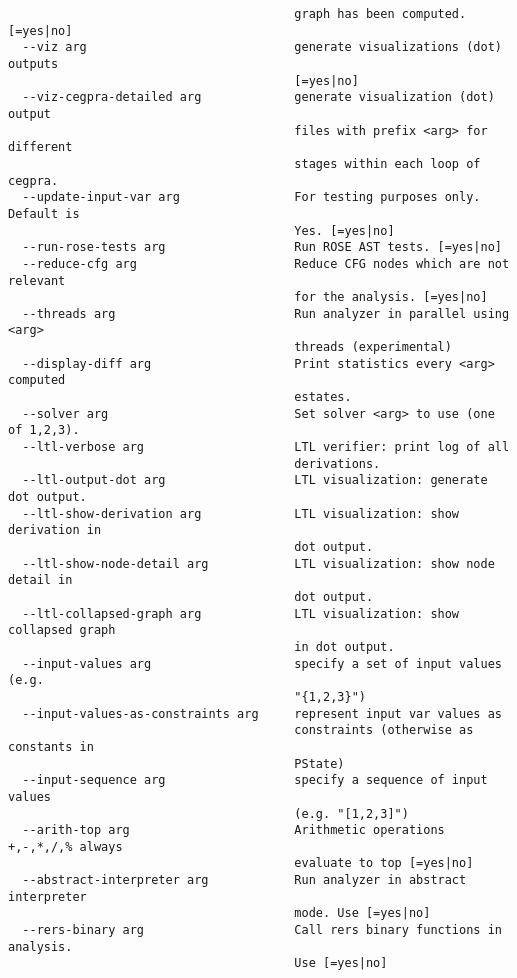 \documentclass[natbib]{article}
\begin{document}
\begin{verbatim}
                                        graph has been computed. [=yes|no]
  --viz arg                             generate visualizations (dot) outputs 
                                        [=yes|no]
  --viz-cegpra-detailed arg             generate visualization (dot) output 
                                        files with prefix <arg> for different 
                                        stages within each loop of cegpra.
  --update-input-var arg                For testing purposes only. Default is 
                                        Yes. [=yes|no]
  --run-rose-tests arg                  Run ROSE AST tests. [=yes|no]
  --reduce-cfg arg                      Reduce CFG nodes which are not relevant
                                        for the analysis. [=yes|no]
  --threads arg                         Run analyzer in parallel using <arg> 
                                        threads (experimental)
  --display-diff arg                    Print statistics every <arg> computed 
                                        estates.
  --solver arg                          Set solver <arg> to use (one of 1,2,3).
  --ltl-verbose arg                     LTL verifier: print log of all 
                                        derivations.
  --ltl-output-dot arg                  LTL visualization: generate dot output.
  --ltl-show-derivation arg             LTL visualization: show derivation in 
                                        dot output.
  --ltl-show-node-detail arg            LTL visualization: show node detail in 
                                        dot output.
  --ltl-collapsed-graph arg             LTL visualization: show collapsed graph
                                        in dot output.
  --input-values arg                    specify a set of input values (e.g. 
                                        "{1,2,3}")
  --input-values-as-constraints arg     represent input var values as 
                                        constraints (otherwise as constants in 
                                        PState)
  --input-sequence arg                  specify a sequence of input values 
                                        (e.g. "[1,2,3]")
  --arith-top arg                       Arithmetic operations +,-,*,/,% always 
                                        evaluate to top [=yes|no]
  --abstract-interpreter arg            Run analyzer in abstract interpreter 
                                        mode. Use [=yes|no]
  --rers-binary arg                     Call rers binary functions in analysis.
                                        Use [=yes|no]

\end{verbatim}
\end{document}
